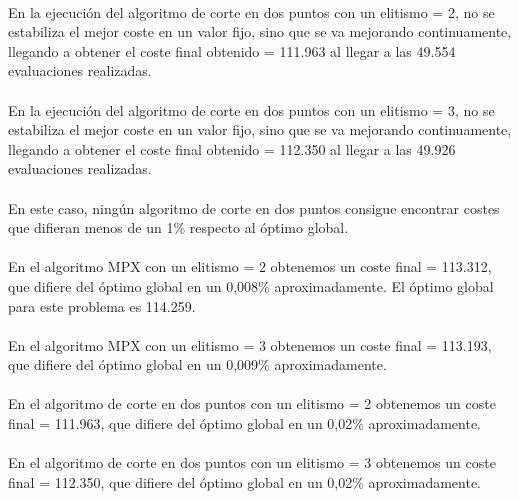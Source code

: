 	\paragraph{}En la ejecución del algoritmo de corte en dos puntos con un elitismo = 2, no se estabiliza el mejor coste en un valor fijo, sino que se va mejorando continuamente, llegando a obtener el coste final obtenido = 111.963 al llegar a las 49.554 evaluaciones realizadas.
	
	\paragraph{}En la ejecución del algoritmo de corte en dos puntos con un elitismo = 3, no se estabiliza el mejor coste en un valor fijo, sino que se va mejorando continuamente, llegando a obtener el coste final obtenido = 112.350 al llegar a las 49.926 evaluaciones realizadas.
	
	\paragraph{}En este caso, ningún algoritmo de corte en dos puntos consigue encontrar costes que difieran menos de un 1\% respecto al óptimo global.
	
	\paragraph{}En el algoritmo MPX con un elitismo = 2 obtenemos un coste final = 113.312, que difiere del óptimo global en un 0,008\% aproximadamente. El óptimo global para este problema es 114.259.
	
	\paragraph{}En el algoritmo MPX con un elitismo = 3 obtenemos un coste final = 113.193, que difiere del óptimo global en un 0,009\% aproximadamente.
	
	\paragraph{}En el algoritmo de corte en dos puntos con un elitismo = 2 obtenemos un coste final = 111.963, que difiere del óptimo global en un 0,02\% aproximadamente.
	
	\paragraph{}En el algoritmo de corte en dos puntos con un elitismo = 3 obtenemos un coste final = 112.350, que difiere del óptimo global en un 0,02\% aproximadamente.
	
